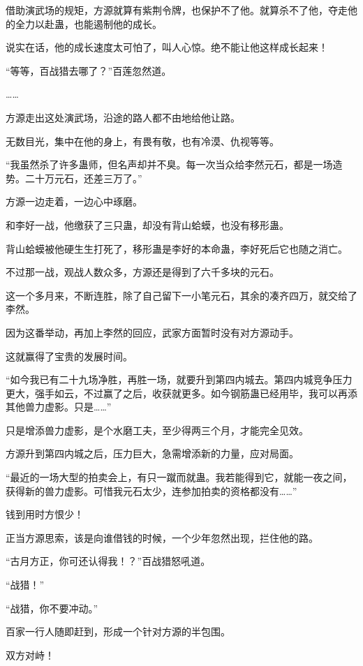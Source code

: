 \begin{this_body}
借助演武场的规矩，方源就算有紫荆令牌，也保护不了他。就算杀不了他，夺走他的全力以赴蛊，也能遏制他的成长。

说实在话，他的成长速度太可怕了，叫人心惊。绝不能让他这样成长起来！

“等等，百战猎去哪了？”百莲忽然道。

……

方源走出这处演武场，沿途的路人都不由地给他让路。

无数目光，集中在他的身上，有畏有敬，也有冷漠、仇视等等。

“我虽然杀了许多蛊师，但名声却并不臭。每一次当众给李然元石，都是一场造势。二十万元石，还差三万了。”

方源一边走着，一边心中琢磨。

和李好一战，他缴获了三只蛊，却没有背山蛤蟆，也没有移形蛊。

背山蛤蟆被他硬生生打死了，移形蛊是李好的本命蛊，李好死后它也随之消亡。

不过那一战，观战人数众多，方源还是得到了六千多块的元石。

这一个多月来，不断连胜，除了自己留下一小笔元石，其余的凑齐四万，就交给了李然。

因为这番举动，再加上李然的回应，武家方面暂时没有对方源动手。

这就赢得了宝贵的发展时间。

“如今我已有二十九场净胜，再胜一场，就要升到第四内城去。第四内城竞争压力更大，强手如云，不过赢了之后，收获就更多。如今钢筋蛊已经用毕，我可以再添其他兽力虚影。只是……”

只是增添兽力虚影，是个水磨工夫，至少得两三个月，才能完全见效。

方源升到第四内城之后，压力巨大，急需增添新的力量，应对局面。

“最近的一场大型的拍卖会上，有只一蹴而就蛊。我若能得到它，就能一夜之间，获得新的兽力虚影。可惜我元石太少，连参加拍卖的资格都没有……”

钱到用时方恨少！

正当方源思索，该是向谁借钱的时候，一个少年忽然出现，拦住他的路。

“古月方正，你可还认得我！？”百战猎怒吼道。

“战猎！”

“战猎，你不要冲动。”

百家一行人随即赶到，形成一个针对方源的半包围。

双方对峙！

\end{this_body}

